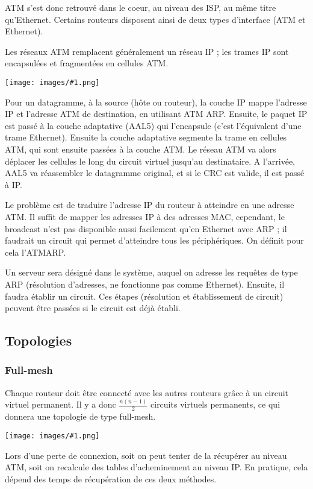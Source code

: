 \documentclass[10pt,a4paper]{report}
\newcommand{\dessin}[1]{\begin{center}\texttt{[image: images/\#1.png]}\end{center}}
\begin{document}
	ATM s'est donc retrouvé dans le coeur, au niveau des ISP, au même titre qu'Ethernet. Certains routeurs disposent ainsi de deux types d'interface (ATM et Ethernet).	
	
	Les réseaux ATM remplacent généralement un réseau IP ; les trames IP sont encapsulées et fragmentées en cellules ATM.
	
	\dessin{13}
	
	Pour un datagramme, à la source (hôte ou routeur), la couche IP mappe l'adresse IP et l'adresse ATM de destination, en utilisant ATM ARP. Ensuite, le paquet IP est passé à la couche adaptative (AAL5) qui l'encapsule (c'est l'équivalent d'une trame Ethernet). Ensuite la couche adaptative segmente la trame en cellules ATM, qui sont ensuite passées à la couche ATM.
	Le réseau ATM va alors déplacer les cellules le long du circuit virtuel jusqu'au destinataire.
	A l'arrivée, AAL5 va réassembler le datagramme original, et si le CRC est valide, il est passé à IP.

	Le problème est de traduire l'adresse IP du routeur à atteindre en une adresse ATM. Il suffit de mapper les adresses IP à des adresses MAC, cependant, le broadcast n'est pas disponible aussi facilement qu'en Ethernet avec ARP ; il faudrait un circuit qui permet d'atteindre tous les périphériques. On définit pour cela l'ATMARP.
	
	Un serveur sera désigné dans le système, auquel on adresse les requêtes de type ARP (résolution d'adresses, ne fonctionne pas comme Ethernet). Ensuite, il faudra établir un circuit. Ces étapes (résolution et établissement de circuit) peuvent être passées si le circuit est déjà établi.
	
		\subsection{Topologies}
			\subsubsection{Full-mesh}
		
			Chaque routeur doit être connecté avec les autres routeurs grâce à un circuit virtuel permanent. Il y a donc $\frac{n (n - 1)}{2}$ circuits virtuels permanents, ce qui donnera une topologie de type full-mesh.
		
			\dessin{14}
	
			Lors d'une perte de connexion, soit on peut tenter de la récupérer au niveau ATM, soit on recalcule des tables d'acheminement au niveau IP. En pratique, cela dépend des temps de récupération de ces deux méthodes.
	
\end{document}
